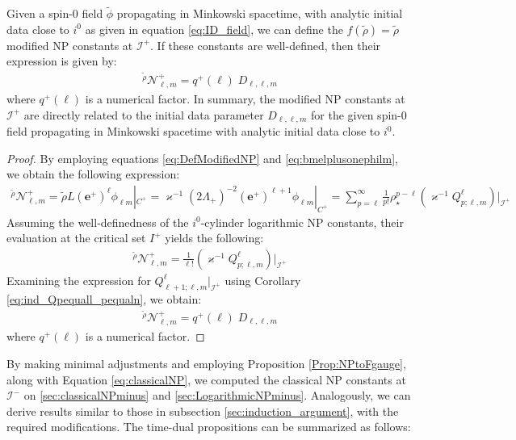 \begin{proposition}
    Given a spin-0 field $\tilde{\phi}$ propagating in Minkowski spacetime, with analytic initial data close to $i^0$ as given in equation \eqref{eq:ID_field}, we can define the $f(\tilde{\rho})=\tilde{\rho}$ modified NP constants at $\mathscr{I}^+$. If these constants are well-defined, then their expression is given by:
    \begin{align}
      {}^{\tilde{\rho}}\mathcal{N}^{+}_{\ell,m}=q^{+}(\ell) \;D_{\ell,\ell,m}
    \end{align}
    where $q^{+}(\ell)$ is a numerical factor. In summary, the modified NP constants at $\mathscr{I}^{+}$ are directly related to the initial data parameter $D_{\ell,\ell,m}$ for the given spin-0 field propagating in Minkowski spacetime with analytic initial data close to $i^0$.
\end{proposition}

\begin{proof}             
    By employing equations \eqref{eq:DefModifiedNP} and \eqref{eq:bmelplusonephilm}, we obtain the following expression:
    \begin{align}
      {}^{\tilde{\rho}}\mathcal{N}^{+}_{\ell,m}= \tilde{\rho}L(\boldsymbol{e}^{+})^{\ell}\phi_{\ell m}|_{{C}^{+}}= \varkappa^{-1}(2\Lambda_+)^{-2}(\boldsymbol{e}^{+})^{\ell+1}\phi_{\ell m}|_{{C}^{+}} =\sum_{p=\ell}^{\infty}\frac{1}{p!}\rho_{\star}^{p-\ell}(\varkappa^{-1}Q^{\ell}_{p;\ell,m})|_{\mathscr{I}^{+}}
    \end{align}
    Assuming the well-definedness of the $i^0$-cylinder logarithmic NP constants, their evaluation at the critical set $I^{+}$ yields the following:
    \begin{align}
      {}^{\tilde{\rho}}\mathcal{N}^{+}_{\ell,m} =\frac{1}{\ell!} (\varkappa^{-1}Q^{\ell}_{p;\ell,m})|_{\mathscr{I}^{+}}
    \end{align}
    Examining the expression for $Q^{\ell}_{\ell+1;\ell,m}|_{\mathscr{I}^{+}}$ using Corollary \ref{eq:ind_Qpequall_pequaln}, we obtain:
    \begin{align}
      {}^{\tilde{\rho}}\mathcal{N}^{+}_{\ell,m}=q^{+}(\ell) \;D_{\ell,\ell,m}
    \end{align}
    where $q^{+}(\ell)$ is a numerical factor.
\end{proof}

By making minimal adjustments and employing Proposition \ref{Prop:NPtoFgauge}, along with Equation \eqref{eq:classicalNP}, we computed the classical NP constants at $\mathscr{I}^{-}$ on \ref{sec:classicalNPminus} and \ref{sec:LogarithmicNPminus}. Analogously, we can derive results similar to those in subsection \ref{sec:induction_argument}, with the required modifications. The time-dual propositions can be summarized as follows:
    
